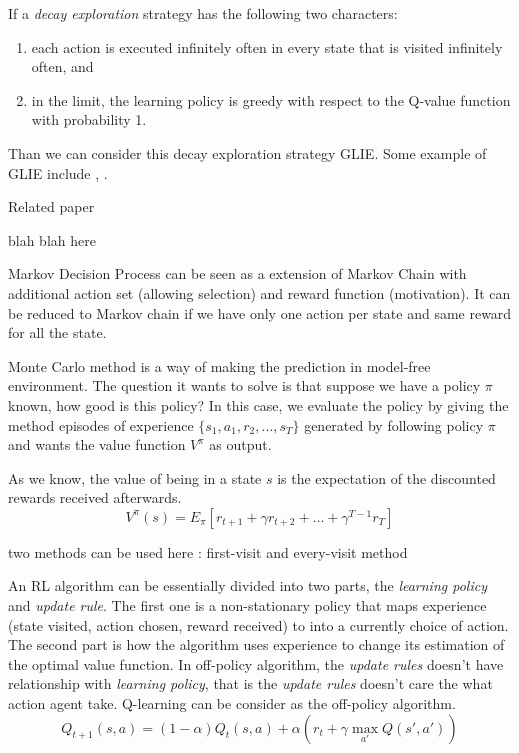 \documentclass[9pt]{article}
\begin{document}
If a \textit{decay exploration} strategy has the following two characters:
\begin{enumerate}
\item each action is executed infinitely often in every state that is visited infinitely often, and
\item in the limit, the learning policy is greedy with respect to the Q-value function with probability 1.
\end{enumerate}
Than we can consider this decay exploration strategy GLIE. Some example of GLIE include , .


 \Working

 \Working

Related paper


blah blah here

Markov Decision Process can be seen as a extension of Markov Chain with additional action set (allowing selection) and reward function (motivation). It can be reduced to Markov chain if we have only one action per state and same reward for all the state.


 Monte Carlo method is a way of making the prediction in model-free environment. The question it wants to solve is that suppose we have a policy $\pi$ known, how good is this policy? In this case, we evaluate the policy by giving the method episodes of experience $\{s_1,a_1,r_2,\ldots,s_T\}$ generated by following policy $\pi$ and wants the value function $V^{\pi}$ as output.

As we know, the value of being in a state $s$ is the expectation of the discounted rewards received afterwards. 
\[
V^{\pi}(s) = E_{\pi}[r_{t+1} + \gamma r_{t+2} + \ldots + \gamma^{T-1}r_T]
\]

two methods can be used here : first-visit and every-visit method



An RL algorithm can be essentially divided into two parts, the \textit{learning policy} and \textit{update rule}. The first one is a non-stationary policy that maps experience (state visited, action chosen, reward received) to into a currently choice of action. The second part is how the algorithm uses experience to change its estimation of the optimal value function.
In off-policy algorithm, the \textit{update rules} doesn't have relationship with \textit{learning policy}, that is the \textit{update rules} doesn't care the what action agent take. Q-learning can be consider as the off-policy algorithm.
\begin{displaymath}
  Q_{t+1}(s,a) = (1-\alpha)Q_{t}(s,a)+\alpha(r_t+\gamma \max_{a'}Q(s',a'))
\end{displaymath}
\end{document}
